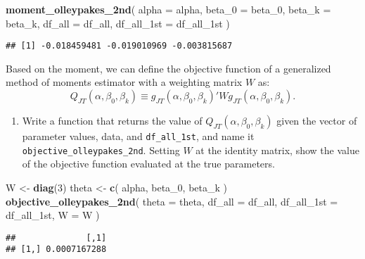 \documentclass[
]{book}
\newenvironment{Shaded}{\begin{snugshade}}{\end{snugshade}}
\newcommand{\AttributeTok}[1]{\textcolor[rgb]{0.13,0.29,0.53}{#1}}
\newcommand{\DecValTok}[1]{\textcolor[rgb]{0.00,0.00,0.81}{#1}}
\newcommand{\FunctionTok}[1]{\textcolor[rgb]{0.13,0.29,0.53}{\textbf{#1}}}
\newcommand{\NormalTok}[1]{#1}
\newcommand{\OtherTok}[1]{\textcolor[rgb]{0.56,0.35,0.01}{#1}}
\providecommand{\tightlist}{%
  \setlength{\itemsep}{0pt}\setlength{\parskip}{0pt}}
\begin{document}
\begin{Shaded}
\begin{Highlighting}[]
\FunctionTok{moment\_olleypakes\_2nd}\NormalTok{(}
  \AttributeTok{alpha =}\NormalTok{ alpha, }
  \AttributeTok{beta\_0 =}\NormalTok{ beta\_0, }
  \AttributeTok{beta\_k =}\NormalTok{ beta\_k, }
  \AttributeTok{df\_all =}\NormalTok{ df\_all, }
  \AttributeTok{df\_all\_1st =}\NormalTok{ df\_all\_1st}
\NormalTok{  )}
\end{Highlighting}
\end{Shaded}

\begin{verbatim}
## [1] -0.018459481 -0.019010969 -0.003815687
\end{verbatim}

Based on the moment, we can define the objective function of a generalized method of moments estimator with a weighting matrix \(W\) as:
\[
Q_{JT}(\alpha, \beta_0, \beta_k) \equiv g_{JT}(\alpha, \beta_0, \beta_k)' W g_{JT}(\alpha, \beta_0, \beta_k).
\]

\begin{enumerate}
\def\labelenumi{\arabic{enumi}.}
\setcounter{enumi}{6}
\tightlist
\item
  Write a function that returns the value of \(Q_{JT}(\alpha, \beta_0, \beta_k)\) given the vector of parameter values, data, and \texttt{df\_all\_1st}, and name it \texttt{objective\_olleypakes\_2nd}. Setting \(W\) at the identity matrix, show the value of the objective function evaluated at the true parameters.
\end{enumerate}

\begin{Shaded}
\begin{Highlighting}[]
\NormalTok{W }\OtherTok{\textless{}{-}} \FunctionTok{diag}\NormalTok{(}\DecValTok{3}\NormalTok{)}
\NormalTok{theta }\OtherTok{\textless{}{-}} 
  \FunctionTok{c}\NormalTok{(}
\NormalTok{    alpha, }
\NormalTok{    beta\_0, }
\NormalTok{    beta\_k}
\NormalTok{    )}
\FunctionTok{objective\_olleypakes\_2nd}\NormalTok{(}
  \AttributeTok{theta =}\NormalTok{ theta, }
  \AttributeTok{df\_all =}\NormalTok{ df\_all, }
  \AttributeTok{df\_all\_1st =}\NormalTok{ df\_all\_1st,}
  \AttributeTok{W =}\NormalTok{ W}
\NormalTok{  )}
\end{Highlighting}
\end{Shaded}

\begin{verbatim}
##              [,1]
## [1,] 0.0007167288
\end{verbatim}
\end{document}
